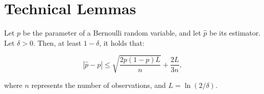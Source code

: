 \section{Technical Lemmas}
\label{apx:lemmas}

\begin{lemma}
\label{lem:bernstein_bernoulli}
    Let $p$ be the parameter of a Bernoulli random variable, and let $\widehat{p}$ be its estimator. Let $\delta > 0$. Then, \wp at least $1-\delta$, it holds that:
    
    \begin{equation*}
        |\widehat{p} - p| \le \sqrt{\frac{2 p (1-p) L}{n}} + \frac{2 L}{3 n},
    \end{equation*}

    where $n$ represents the number of observations, and $L=\ln(2/\delta)$.
\end{lemma}

